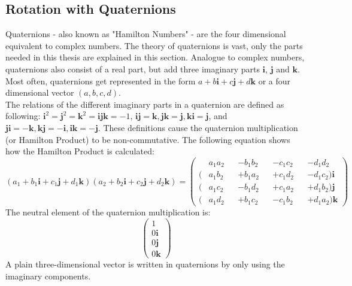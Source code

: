 \subsection{Rotation with Quaternions}
\label{sec:RotationQuaternion}
Quaternions - also known as "Hamilton Numbers" - are the four dimensional equivalent to complex numbers. The theory of quaternions is vast, only the parts needed in this thesis are explained in this section. Analogue to complex numbers, quaternions also consist of a real part, but add three imaginary parts $\textbf{i}$, $\textbf{j}$ and $\textbf{k}$. Most often, quaternions get represented in the form $a+b\textbf{i}+c\textbf{j}+d\textbf{k}$ or a four dimensional vector $(a, b, c, d)$.\\
The relations of the different imaginary parts in a quaternion are defined as following: $\textbf{i}^{2}=\textbf{j}^{2}=\textbf{k}^{2}=\textbf{ijk}=-1$, $\textbf{ij}=\textbf{k}, \textbf{jk}=\textbf{j}, \textbf{ki}=\textbf{j}$, and  $\textbf{ji}=-\textbf{k}, \textbf{kj}=-\textbf{i}, \textbf{ik}=-\textbf{j}$. These definitions cause the quaternion multiplication (or Hamilton Product) to be non-commutative. The following equation shows how the Hamilton Product is calculated:
\begin{equation*}
    (a_{1}+b_{1}\textbf{i}+c_{1}\textbf{j}+d_{1}\textbf{k})(a_{2}+b_{2}\textbf{i}+c_{2}\textbf{j}+d_{2}\textbf{k})
    =
    \begin{pmatrix}
          & a_1a_2 &  & - b_1b_2 &  & - c_1c_2 &  & - d_1d_2             \\
        ( & a_1b_2 &  & + b_1a_2 &  & + c_1d_2 &  & - d_1c_2) \textbf{i} \\
        ( & a_1c_2 &  & - b_1d_2 &  & + c_1a_2 &  & + d_1b_2) \textbf{j} \\
        ( & a_1d_2 &  & + b_1c_2 &  & - c_1b_2 &  & + d_1a_2) \textbf{k}
    \end{pmatrix}
\end{equation*}
The neutral element of the quaternion multiplication is:
\begin{equation*}
    \begin{pmatrix}
        1           \\
        0\textbf{i} \\
        0\textbf{j} \\
        0\textbf{k}
    \end{pmatrix}
\end{equation*}
A plain three-dimensional vector is written in quaternions by only using the imaginary components.

